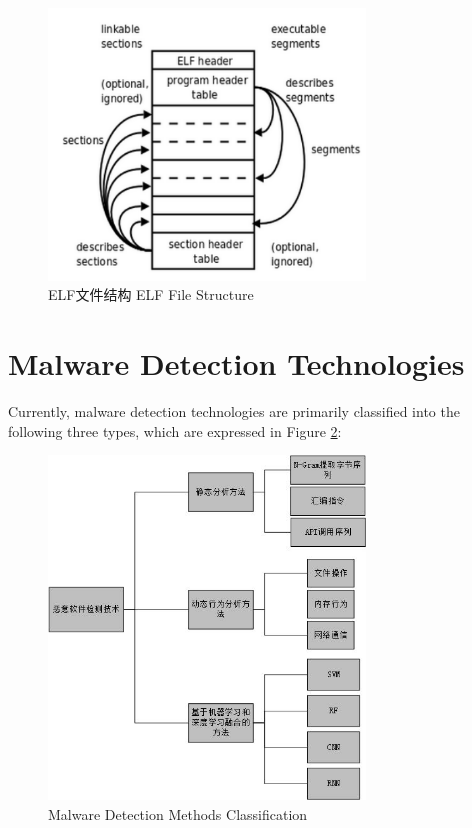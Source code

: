 \begin{figure}[hbt]
	\centering
	\includegraphics[width=0.75\textwidth]{figures/2.1}
	\caption{ELF文件结构 ELF File Structure}\label{fig:2.1}
\end{figure}

\section{Malware Detection Technologies}

Currently, malware detection technologies are primarily classified into the following three types, which are expressed in Figure \ref{fig:2.2}:

\begin{figure}[hbt]
	\centering
	\includegraphics[width=0.75\textwidth]{figures/2.2}
	\caption{Malware Detection Methods Classification}\label{fig:2.2}
\end{figure}

